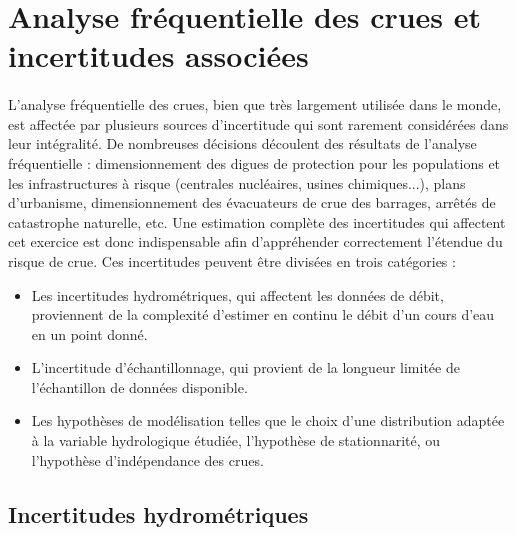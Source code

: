 	\section*{Analyse fréquentielle des crues et incertitudes associées}
	\paragraph{} L'analyse fréquentielle des crues, bien que très largement utilisée dans le monde, est affectée par plusieurs sources d'incertitude qui sont rarement considérées dans leur intégralité. De nombreuses décisions découlent des résultats de l'analyse fréquentielle : dimensionnement des digues de protection pour les populations et les infrastructures à risque (centrales nucléaires, usines chimiques...), plans d'urbanisme, dimensionnement des évacuateurs de crue des barrages, arrêtés de catastrophe naturelle, etc. Une estimation complète des incertitudes qui affectent cet exercice est donc indispensable afin d'appréhender correctement l'étendue du risque de crue. Ces incertitudes peuvent être divisées en trois catégories :
	\begin{itemize}
	
		\item Les incertitudes hydrométriques, qui affectent les données de débit, proviennent de la complexité d'estimer en continu le débit d'un cours d'eau en un point donné.
		
		\item L'incertitude d'échantillonnage, qui provient de la longueur limitée de l'échantillon de données disponible.

		\item Les hypothèses de modélisation telles que le choix d'une distribution adaptée à la variable hydrologique étudiée, l'hypothèse de stationnarité, ou l'hypothèse  d'indépendance des crues.
	\end{itemize}
	
	\subsection*{Incertitudes hydrométriques}
	
